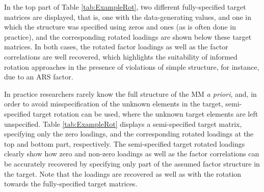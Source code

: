 \documentclass[a4paper,man,natbib]{apa6}
\begin{document}
\begin{linenumbers}
In the top part of Table \ref{tab:ExampleRot}, two different fully-specified target matrices are displayed, that is, one with the data-generating values, and one in which the structure was specified using zeros and ones (as is often done in practice), and the corresponding rotated loadings are shown below these target matrices. In both cases, the rotated factor loadings as well as the factor correlations are well recovered, which highlights the suitability of informed rotation approaches in the presence of violations of simple structure, for instance, due to an ARS factor.

In practice researchers rarely know the full structure of the MM \textit{a priori}, and, in order to avoid misspecification of the unknown elements in the target, semi-specified target rotation can be used, where the unknown target elements are left unspecified. Table \ref{tab:ExampleRot} displays a semi-specified target matrix, specifying only the zero loadings, and the corresponding rotated loadings at the top and bottom part, respectively. The semi-specified target rotated loadings clearly show how zero and non-zero loadings as well as the factor correlations can be accurately recovered by specifying only part of the assumed factor structure in the target. Note that the loadings are recovered as well as with the rotation towards the fully-specified target matrices.


\end{linenumbers}
\end{document}
